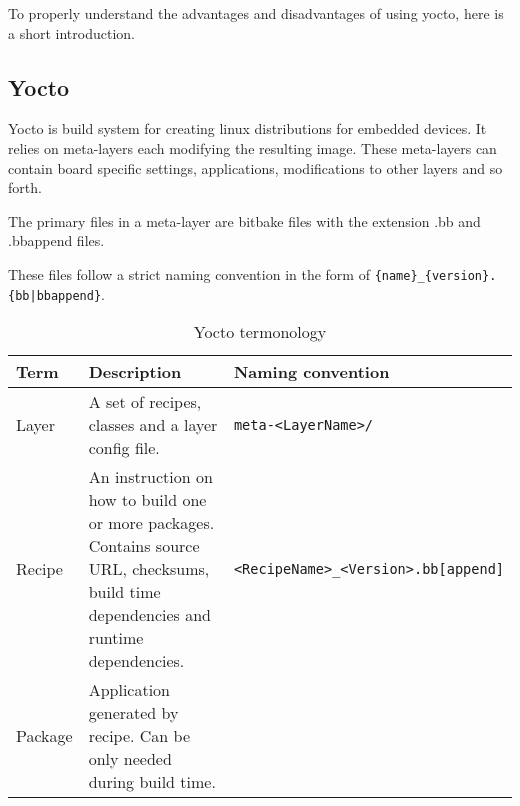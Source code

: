 \documentclass[../../main.tex]{subfiles}
\begin{document}
To properly understand the advantages and disadvantages of using yocto, here is a short introduction.

\subsection{Yocto}%
\label{sub:yocto}

Yocto is build system for creating linux distributions for embedded devices. It relies on meta-layers
each modifying the resulting image. These meta-layers can contain board specific settings,
applications, modifications to other layers and so forth.

The primary files in a meta-layer are bitbake files with the extension .bb and .bbappend files.

These files follow a strict naming convention in the form of
\texttt{\{name\}\_\{version\}.\{bb|bbappend\}}.\\

\begin{table}[h]
	\centering
	\caption{Yocto termonology}
	\label{tab:label}
	\begin{tabular}{lp{}p{5cm}}
		\textbf{Term} & \textbf{Description} & \textbf{Naming convention}\\
		\hline
		Layer & A set of recipes, classes and a layer config file. &
		\texttt{meta-<LayerName>/} \\
		Recipe & An instruction on how to build one or more packages.
		Contains source URL, checksums, build time dependencies and runtime dependencies.
					 & \texttt{<RecipeName>_<Version>.bb[append]}\\
		Package & Application generated by recipe. Can be only needed during build time. &\\
	\end{tabular}
\end{table}



%
%
%
%
%
\end{document}
